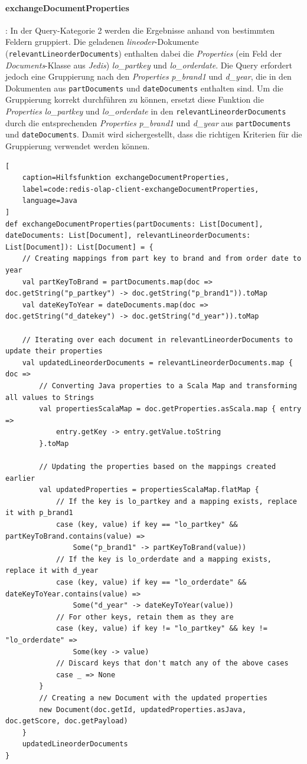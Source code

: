 \paragraph{exchangeDocumentProperties}: In der Query-Kategorie 2 werden die Ergebnisse anhand von bestimmten Feldern gruppiert.
Die geladenen \emph{lineoder}-Dokumente (\lstinline|relevantLineorderDocuments|) enthalten dabei die \emph{Properties} (ein Feld der \emph{Documents}-Klasse aus \emph{Jedis}) \emph{lo\_partkey} und \emph{lo\_orderdate}. Die Query erfordert jedoch eine Gruppierung nach den \emph{Properties} \emph{p\_brand1} und \emph{d\_year}, die in den Dokumenten aus \lstinline|partDocuments| und \lstinline|dateDocuments| enthalten sind. Um die Gruppierung korrekt durchführen zu können, ersetzt diese Funktion die \emph{Properties} \emph{lo\_partkey} und \emph{lo\_orderdate} in den \lstinline|relevantLineorderDocuments| durch die entsprechenden \emph{Properties} \emph{p\_brand1} und \emph{d\_year} aus \lstinline|partDocuments| und \lstinline|dateDocuments|. Damit wird sichergestellt, dass die richtigen Kriterien für die Gruppierung verwendet werden können.

\begin{lstlisting}[
    caption=Hilfsfunktion exchangeDocumentProperties,
    label=code:redis-olap-client-exchangeDocumentProperties,
    language=Java
]
def exchangeDocumentProperties(partDocuments: List[Document], dateDocuments: List[Document], relevantLineorderDocuments: List[Document]): List[Document] = {
	// Creating mappings from part key to brand and from order date to year
	val partKeyToBrand = partDocuments.map(doc => doc.getString("p_partkey") -> doc.getString("p_brand1")).toMap
	val dateKeyToYear = dateDocuments.map(doc => doc.getString("d_datekey") -> doc.getString("d_year")).toMap

	// Iterating over each document in relevantLineorderDocuments to update their properties
	val updatedLineorderDocuments = relevantLineorderDocuments.map { doc =>
		// Converting Java properties to a Scala Map and transforming all values to Strings
		val propertiesScalaMap = doc.getProperties.asScala.map { entry =>
			entry.getKey -> entry.getValue.toString
		}.toMap

		// Updating the properties based on the mappings created earlier
		val updatedProperties = propertiesScalaMap.flatMap {
			// If the key is lo_partkey and a mapping exists, replace it with p_brand1
			case (key, value) if key == "lo_partkey" && partKeyToBrand.contains(value) =>
				Some("p_brand1" -> partKeyToBrand(value))
			// If the key is lo_orderdate and a mapping exists, replace it with d_year
			case (key, value) if key == "lo_orderdate" && dateKeyToYear.contains(value) =>
				Some("d_year" -> dateKeyToYear(value))
			// For other keys, retain them as they are
			case (key, value) if key != "lo_partkey" && key != "lo_orderdate" =>
				Some(key -> value)
			// Discard keys that don't match any of the above cases
			case _ => None
		}
		// Creating a new Document with the updated properties
		new Document(doc.getId, updatedProperties.asJava, doc.getScore, doc.getPayload)
	}
	updatedLineorderDocuments
}
\end{lstlisting}
